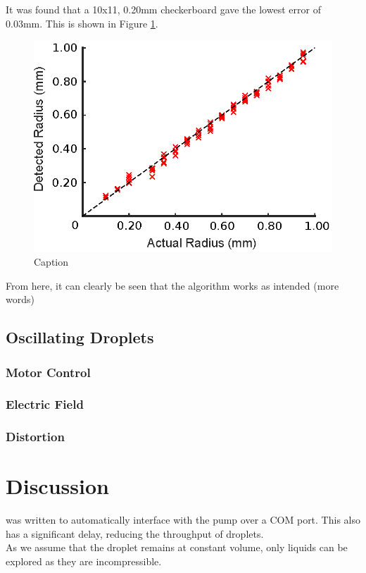 \documentclass{physics_article_B}
\begin{document}
    
    It was found that a 10x11, 0.20mm checkerboard gave the lowest error of 0.03mm. This is shown in Figure \ref{fig:calibsize}. 
        
            \begin{figure}[H]
                \centering
                \hspace*{-1cm}\includegraphics{Figures/CameraCalib.eps}
                \caption{Caption}
                \label{fig:calibsize}
            \end{figure}
        
        From here, it can clearly be seen that the algorithm works as intended (more words)

    \subsection{Oscillating Droplets}
        \subsubsection{Motor Control}
        \subsubsection{Electric Field}
        \subsubsection{Distortion}
    
\section{Discussion}

was written to automatically interface with the pump over a COM port. This also has a significant delay, reducing the throughput of droplets.\\

As we assume that the droplet remains at constant volume, only liquids can be explored as they are incompressible.
\newpage



    

\end{document}
